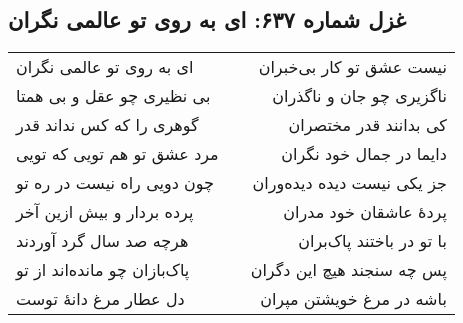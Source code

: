 \begin{center}
\section*{غزل شماره ۶۳۷: ای به روی تو عالمی نگران}
\label{sec:637}
\begin{longtable}{l p{0.5cm} r}
ای به روی تو عالمی نگران
&&
نیست عشق تو کار بی‌خبران
\\
بی نظیری چو عقل و بی همتا
&&
ناگزیری چو جان و ناگذران
\\
گوهری را که کس نداند قدر
&&
کی بدانند قدر مختصران
\\
مرد عشق تو هم تویی که تویی
&&
دایما در جمال خود نگران
\\
چون دویی راه نیست در ره تو
&&
جز یکی نیست دیده دیده‌وران
\\
پرده بردار و بیش ازین آخر
&&
پردهٔ عاشقان خود مدران
\\
هرچه صد سال گرد آوردند
&&
با تو در باختند پاک‌بران
\\
پاک‌بازان چو مانده‌اند از تو
&&
پس چه سنجند هیچ این دگران
\\
دل عطار مرغ دانهٔ توست
&&
باشه در مرغ خویشتن مپران
\\
\end{longtable}
\end{center}
